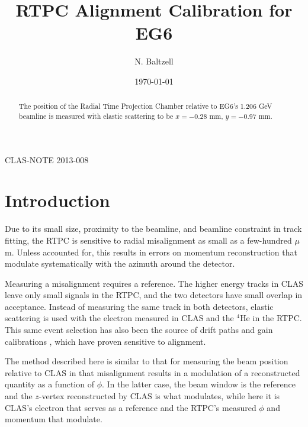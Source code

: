 \documentclass[amsmath,amssymb,notitlepage,12pt]{revtex4-1}
\begin{document}
\hspace*{11.5cm}CLAS-NOTE 2013-008

\title{RTPC Alignment Calibration for EG6}%
\author{N. Baltzell}
\date{\today}
\begin{abstract}
The position of the Radial Time Projection Chamber relative to EG6's 1.206 GeV beamline is measured with elastic scattering to be $x=-0.28$ mm, $y=-0.97$ mm.
\end{abstract}
\maketitle

\section{Introduction}
Due to its small size, proximity to the beamline, and beamline constraint in track fitting, the RTPC is sensitive to radial misalignment as small as a few-hundred $\mu$m.  Unless accounted for, this results in errors on momentum reconstruction that modulate systematically with the azimuth around the detector.

Measuring a misalignment requires a reference.  The higher energy tracks in CLAS leave only small signals in the RTPC, and the two detectors have small overlap in acceptance.  Instead of measuring the same track in both detectors, elastic scattering is used with the electron measured in CLAS and the $^4$He in the RTPC.  This same event selection has also been the source of drift paths and gain calibrations \cite{driftpaths,gains}, which have proven sensitive to alignment.

The method described here
is similar to that for measuring the beam position relative to CLAS \cite{clasbeamoffset} in that misalignment results in a modulation of a reconstructed quantity as a function of $\phi$.  In the latter case, the beam window is the reference and the $z$-vertex reconstructed by CLAS is what modulates, while here it is CLAS's electron that serves as a reference and the RTPC's measured $\phi$ and momentum that modulate. 
\end{document}
